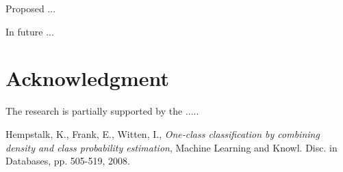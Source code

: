 \documentclass{llncs}
\begin{document}
Proposed ...

In future ...


\section*{Acknowledgment}

\noindent The research is partially supported by the .....

\begin{thebibliography}{1}

Hempstalk, K., Frank, E., Witten, I., \emph{One-class classification by combining density and class probability estimation}, Machine Learning and Knowl. Disc. in Databases, pp. 505-519, 2008.


\end{thebibliography}
\end{document}
